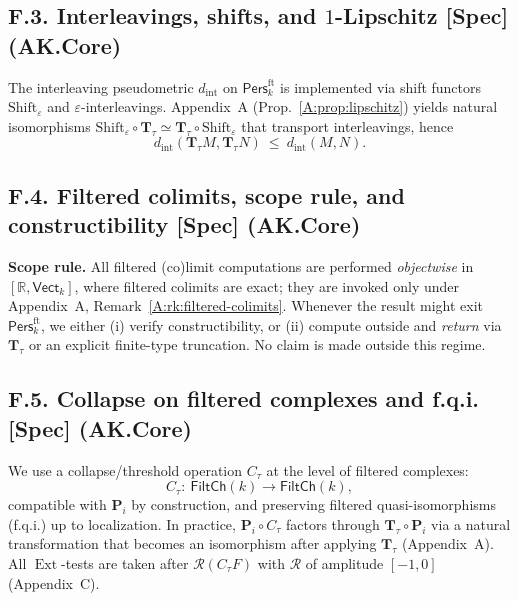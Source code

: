 \documentclass[11pt]{article}
\numberwithin{equation}{section}
\theoremstyle{plain}
\theoremstyle{definition}
\theoremstyle{remark}
\DeclareMathOperator{\Ext}{Ext}
\newcommand{\Pers}{\mathsf{Pers}}
\theoremstyle{plain}
\theoremstyle{definition}
\numberwithin{equation}{section}
\theoremstyle{definition}
\numberwithin{equation}{section}
\theoremstyle{plain}
\theoremstyle{definition}
\theoremstyle{remark}
\begin{document}
\subsection*{F.3. Interleavings, shifts, and \(1\)-Lipschitz [Spec] (AK.Core)}

The interleaving pseudometric \(d_{\mathrm{int}}\) on \(\Pers^{\mathrm{ft}}_k\) is implemented via shift functors
\(\mathrm{Shift}_\varepsilon\) and \(\varepsilon\)-interleavings. Appendix~A (Prop.~\ref{A:prop:lipschitz}) yields natural
isomorphisms \(\mathrm{Shift}_\varepsilon\circ \mathbf{T}_\tau\simeq \mathbf{T}_\tau\circ \mathrm{Shift}_\varepsilon\)
that transport interleavings, hence
\[
d_{\mathrm{int}}(\mathbf{T}_\tau M,\mathbf{T}_\tau N)\ \le\ d_{\mathrm{int}}(M,N).
\]

\subsection*{F.4. Filtered colimits, scope rule, and constructibility [Spec] (AK.Core)}

\textbf{Scope rule.} All filtered (co)limit computations are performed \emph{objectwise} in
\([\mathbb{R},\mathsf{Vect}_k]\), where filtered colimits are exact; they are invoked only under
Appendix~A, Remark~\ref{A:rk:filtered-colimits}. Whenever the result might exit \(\Pers^{\mathrm{ft}}_k\),
we either (i) verify constructibility, or (ii) compute outside and \emph{return} via \(\mathbf{T}_\tau\)
or an explicit finite-type truncation. No claim is made outside this regime.

\subsection*{F.5. Collapse on filtered complexes and f.q.i. [Spec] (AK.Core)}

We use a collapse/threshold operation \(C_\tau\) at the level of filtered complexes:
\[
C_\tau:\ \mathsf{FiltCh}(k)\longrightarrow \mathsf{FiltCh}(k),
\]
compatible with \(\mathbf{P}_i\) by construction, and preserving filtered quasi-isomorphisms (f.q.i.) up to localization.
In practice, \(\mathbf{P}_i\circ C_\tau\) factors through \(\mathbf{T}_\tau\circ \mathbf{P}_i\) via a natural transformation that becomes an isomorphism after applying \(\mathbf{T}_\tau\) (Appendix~A).
All \(\Ext\)-tests are taken after \(\mathcal{R}(C_\tau F)\) with \(\mathcal{R}\) of amplitude \([-1,0]\) (Appendix~C).
\end{document}

